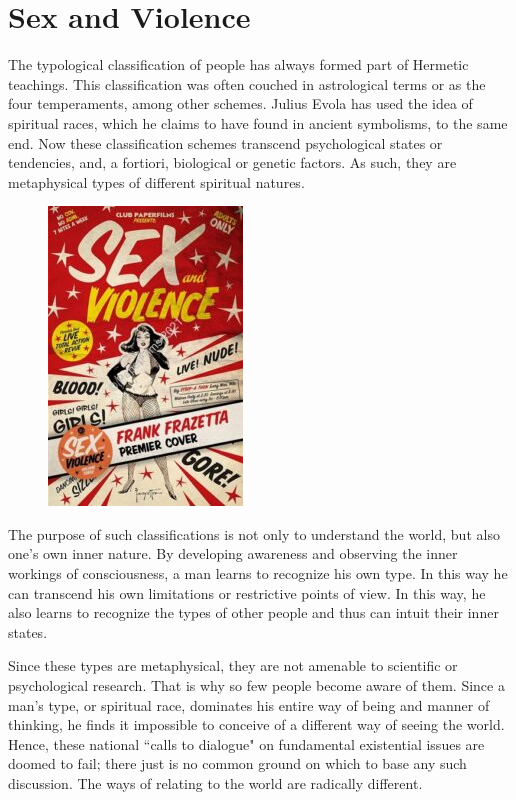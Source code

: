 \section{Sex and Violence}

The typological classification of people has always formed part of Hermetic teachings. This classification was often couched in astrological terms or as the four temperaments, among other schemes. Julius Evola has used the idea of spiritual races, which he claims to have found in ancient symbolisms, to the same end. Now these classification schemes transcend psychological states or tendencies, and, a fortiori, biological or genetic factors. As such, they are metaphysical types of different spiritual natures.

\begin{figure}
 \includegraphics[scale=.6]{a20130404SexandViolence-img001.jpg}
\end{figure}

The purpose of such classifications is not only to understand the world, but also one's own inner nature. By developing awareness and observing the inner workings of consciousness, a man learns to recognize his own type. In this way he can transcend his own limitations or restrictive points of view. In this way, he also learns to recognize the types of other people and thus can intuit their inner states.

Since these types are metaphysical, they are not amenable to scientific or psychological research. That is why so few people become aware of them. Since a man's type, or spiritual race, dominates his entire way of being and manner of thinking, he finds it impossible to conceive of a different way of seeing the world. Hence, these national ``calls to dialogue" on fundamental existential issues are doomed to fail; there just is no common ground on which to base any such discussion. The ways of relating to the world are radically different.

